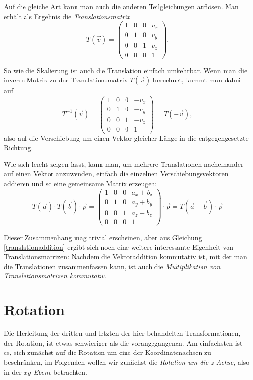 Auf die gleiche Art kann man auch die anderen Teilgleichungen auflösen. Man erhält als Ergebnis die \emph{Translationsmatrix}
\begin{equation}
 T{(\vec v)} =
 \begin{pmatrix}
  1 & 0 & 0 & v_x \\
  0 & 1 & 0 & v_y \\
  0 & 0 & 1 & v_z \\
  0 & 0 & 0 & 1
 \end{pmatrix}.
\end{equation}

So wie die Skalierung ist auch die Translation einfach umkehrbar. Wenn man die inverse Matrix zu der Translationsmatrix $T{(\vec v)}$ berechnet, kommt man dabei auf
\begin{equation}
 T^{-1}{(\vec v)} =
 \begin{pmatrix}
  1 & 0 & 0 & -v_x \\
  0 & 1 & 0 & -v_y \\
  0 & 0 & 1 & -v_z \\
  0 & 0 & 0 & 1
 \end{pmatrix} = T{(-\vec v)},
\end{equation}
also auf die Verschiebung um einen Vektor gleicher Länge in die entgegengesetzte Richtung.

Wie sich leicht zeigen lässt, kann man, um mehrere Translationen nacheinander auf einen Vektor anzuwenden, einfach die einzelnen Verschiebungsvektoren addieren und so eine gemeinsame Matrix erzeugen:
\begin{equation}
 \label{translationaddition}
 T{(\vec a)} \cdot T{(\vec b)} \cdot \vec p = 
 \begin{pmatrix}
  1 & 0 & 0 & a_x + b_x \\
  0 & 1 & 0 & a_y + b_y \\
  0 & 0 & 1 & a_z + b_z \\
  0 & 0 & 0 & 1
 \end{pmatrix} \cdot \vec p = T{(\vec a + \vec b)} \cdot \vec p
\end{equation}

Dieser Zusammenhang mag trivial erscheinen, aber aus Gleichung \ref{translationaddition} ergibt sich noch eine weitere interessante Eigenheit von Translationsmatrizen: Nachdem die Vektoraddition kommutativ ist, mit der man die Translationen zusammenfassen kann, ist auch die \emph{Multiplikation von Translationsmatrizen kommutativ}.

\section{Rotation}
Die Herleitung der dritten und letzten der hier behandelten Transformationen, der Rotation, ist etwas schwieriger als die vorangegangenen. Am einfachsten ist es, sich zunächst auf die Rotation um eine der Koordinatenachsen zu beschränken, im Folgenden wollen wir zunächst die \emph{Rotation um die z-Achse}, also in der \emph{$xy$-Ebene} betrachten.

